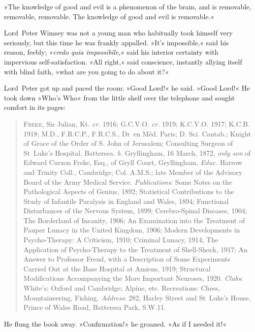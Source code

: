 »The knowledge of good and evil is a phenomenon of the brain, and is removable, removable, removable. The knowledge of good and evil is removable.«

Lord~Peter Wimsey was not a young man who habitually took himself very seriously, but this time he was frankly appalled. »It's impossible,« said his reason, feebly; »\textit{credo quia impossibile,}« said his interior certainty with impervious self-satisfaction. »All right,« said conscience, instantly allying itself with blind faith, »what are you going to do about it?«

Lord~Peter got up and paced the room: »Good Lord!« he said. »Good Lord!« He took down »Who's Who« from the little shelf over the telephone and sought comfort in its pages:

\begin{quote}
\textsc{Freke}, Sir Julian, Kt. \textit{cr.} 1916; G\@.C\@.V\@.O\@. \textit{cr.} 1919; K\@.C\@.V\@.O\@. 1917; K\@.C\@.B\@. 1918; M\@.D\@., F\@.R\@.C\@.P\@., F\@.R\@.C\@.S\@., Dr~en Méd. Paris; D\@. Sci. Cantab.; Knight of Grace of the Order of S\@. John of Jerusalem; Consulting Surgeon of St~Luke's Hospital, Battersea. \textit{b.} Gryllingham, 16 March, 1872, \textit{only son} of Edward Curzon Freke, Esq., of Gryll Court, Gryllingham. \textit{Educ.} Harrow and Trinity Coll., Cambridge; Col. A\@.M\@.S\@.; late Member of the Advisory Board of the Army Medical Service. \textit{Publications}: Some Notes on the Pathological Aspects of Genius, 1892; Statistical Contributions to the Study of Infantile Paralysis in England and Wales, 1894; Functional Disturbances of the Nervous System, 1899; Cerebro-Spinal Diseases, 1904; The Borderland of Insanity, 1906; An Examination into the Treatment of Pauper Lunacy in the United Kingdom, 1906; Modern Developments in Psycho-Therapy: A Criticism, 1910; Criminal Lunacy, 1914; The Application of Psycho-Therapy to the Treatment of Shell-Shock, 1917; An Answer to Professor Freud, with a Description of Some Experiments Carried Out at the Base Hospital at Amiens, 1919; Structural Modifications Accompanying the More Important Neuroses, 1920. \textit{Clubs}: White's; Oxford and Cambridge; Alpine, etc. Recreations: Chess, Mountaineering, Fishing. \textit{Address}: 282, Harley Street and St~Luke's House, Prince of Wales Road, Battersea Park, S\@.W\@.11.
\end{quote}

He flung the book away. »Confirmation!« he groaned. »As if I needed it!«

